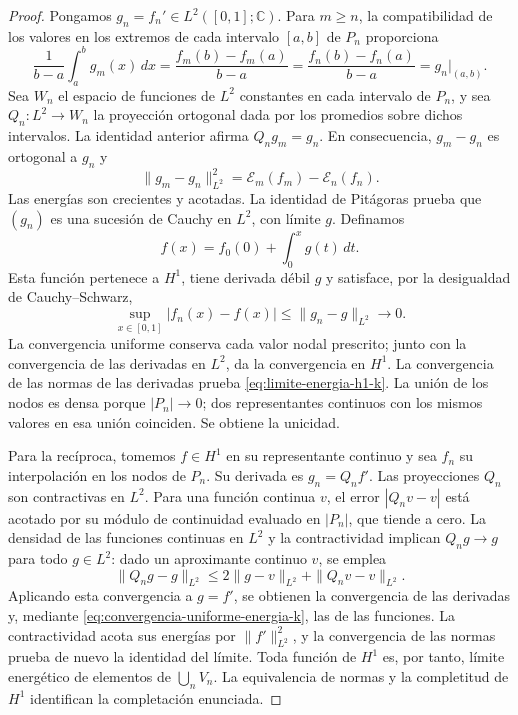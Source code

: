 \documentclass[a4paper,10pt]{article}
\theoremstyle{definition}\newtheorem{definition}[theorem]{Definición}
\theoremstyle{remark}\newtheorem{remark}[theorem]{Observación}
\numberwithin{equation}{section}
\begin{document}
\begin{proof}
Pongamos \(g_n=f_n'\in L^2([0,1];\mathbb C)\). Para
\(m\geq n\), la compatibilidad de los valores en los extremos de cada
intervalo \([a,b]\) de \(P_n\) proporciona
\[
 \frac1{b-a}\int_a^bg_m(x)\,dx
 =\frac{f_m(b)-f_m(a)}{b-a}
 =\frac{f_n(b)-f_n(a)}{b-a}
 =g_n\big|_{(a,b)}.
\]
Sea \(W_n\) el espacio de funciones de \(L^2\) constantes en cada
intervalo de \(P_n\), y sea \(Q_n:L^2\to W_n\) la proyección
ortogonal dada por los promedios sobre dichos intervalos. La identidad
anterior afirma \(Q_ng_m=g_n\). En consecuencia,
\(g_m-g_n\) es ortogonal a \(g_n\) y
\begin{equation}
 \|g_m-g_n\|_{L^2}^2
 =\mathcal E_m(f_m)-\mathcal E_n(f_n).
 \label{eq:pitagoras-gradientes-k}
\end{equation}
Las energías son crecientes y acotadas. La identidad de Pitágoras
prueba que \((g_n)\) es una sucesión de Cauchy en \(L^2\), con
límite \(g\). Definamos
\[
 f(x)=f_0(0)+\int_0^xg(t)\,dt.
\]
Esta función pertenece a \(H^1\), tiene derivada débil \(g\) y
satisface, por la desigualdad de Cauchy--Schwarz,
\begin{equation}
 \sup_{x\in[0,1]}|f_n(x)-f(x)|
 \leq\|g_n-g\|_{L^2}\longrightarrow0.
 \label{eq:convergencia-uniforme-energia-k}
\end{equation}
La convergencia uniforme conserva cada valor nodal prescrito; junto con
la convergencia de las derivadas en \(L^2\), da la convergencia en
\(H^1\). La convergencia de las normas de las derivadas prueba
\eqref{eq:limite-energia-h1-k}. La unión de los nodos es densa porque
\(|P_n|\to0\); dos representantes continuos con los mismos valores
en esa unión coinciden. Se obtiene la unicidad.

Para la recíproca, tomemos \(f\in H^1\) en su representante
continuo y sea \(f_n\) su interpolación en los nodos de \(P_n\).
Su derivada es \(g_n=Q_nf'\). Las proyecciones \(Q_n\) son
contractivas en \(L^2\). Para una función continua \(v\), el
error \(|Q_nv-v|\) está acotado por su módulo de continuidad
evaluado en \(|P_n|\), que tiende a cero. La densidad de las
funciones continuas en \(L^2\) y la contractividad implican
\(Q_ng\to g\) para todo \(g\in L^2\): dado un aproximante
continuo \(v\), se emplea
\[
 \|Q_ng-g\|_{L^2}
 \leq 2\|g-v\|_{L^2}+\|Q_nv-v\|_{L^2}.
\]
Aplicando esta convergencia a \(g=f'\), se obtienen la convergencia
de las derivadas y, mediante \eqref{eq:convergencia-uniforme-energia-k},
las de las funciones. La contractividad acota sus energías por
\(\|f'\|_{L^2}^2\), y la convergencia de las normas prueba de
nuevo la identidad del límite. Toda función de \(H^1\) es, por
tanto, límite energético de elementos de \(\bigcup_nV_n\).
La equivalencia de normas y la completitud de \(H^1\) identifican
la completación enunciada.
\end{proof}
\end{document}
